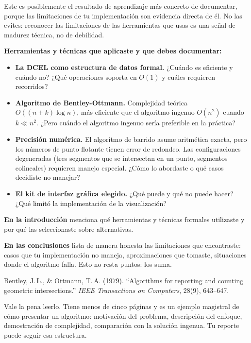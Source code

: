 \documentclass[12pt, oneside]{article}
\begin{document}
Este es posiblemente el resultado de aprendizaje más concreto de
documentar, porque las limitaciones de tu implementación son evidencia
directa de él.  No las evites: reconocer las limitaciones de las
herramientas que usas es una señal de madurez técnica, no de debilidad.

\textbf{Herramientas y técnicas que aplicaste y que debes documentar:}

\begin{itemize}
  \item \textbf{La DCEL como estructura de datos formal.}  ¿Cuándo es
        eficiente y cuándo no?  ¿Qué operaciones soporta en $O(1)$ y
        cuáles requieren recorridos?

  \item \textbf{Algoritmo de Bentley-Ottmann.}  Complejidad teórica
        $O((n+k)\log n)$, más eficiente que el algoritmo ingenuo
        $O(n^2)$ cuando $k \ll n^2$.  ¿Pero cuándo el algoritmo
        ingenuo sería preferible en la práctica?

  \item \textbf{Precisión numérica.}  El algoritmo de barrido asume
        aritmética exacta, pero los números de punto flotante tienen
        error de redondeo.  Las configuraciones degeneradas (tres
        segmentos que se intersectan en un punto, segmentos colineales)
        requieren manejo especial.  ¿Cómo lo abordaste o qué casos
        decidiste no manejar?

  \item \textbf{El kit de interfaz gráfica elegido.}  ¿Qué puede y
        qué no puede hacer?  ¿Qué limitó la implementación de la
        visualización?
\end{itemize}

\textbf{En la introducción} menciona qué herramientas y técnicas formales
utilizaste y por qué las seleccionaste sobre alternativas.

\textbf{En las conclusiones} lista de manera honesta las limitaciones
que encontraste: casos que tu implementación no maneja, aproximaciones
que tomaste, situaciones donde el algoritmo falla.  Esto no resta
puntos: los suma.

\begin{tecnico}
  Bentley, J.\,L., \& Ottmann, T.\,A. (1979).
  ``Algorithms for reporting and counting geometric intersections.''
  \textit{IEEE Transactions on Computers}, 28(9), 643--647.

  Vale la pena leerlo.  Tiene menos de cinco páginas y es un ejemplo
  magistral de cómo presentar un algoritmo: motivación del problema,
  descripción del enfoque, demostración de complejidad, comparación
  con la solución ingenua.  Tu reporte puede seguir esa estructura.
\end{tecnico}
\end{document}

